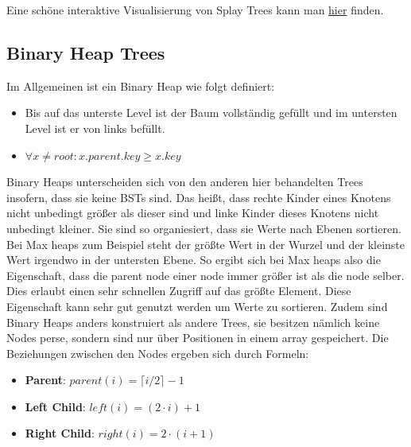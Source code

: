 \documentclass[
../AuD-Zusammenfassung.tex,
]
{subfiles}
\begin{document}
\begin{minipage}[t]{\textwidth}
    \centering
\end{minipage}

Eine schöne interaktive Visualisierung von Splay Trees kann man \href{https://www.cs.usfca.edu/~galles/visualization/SplayTree.html}{hier} finden.


\subsection{Binary Heap Trees}
Im Allgemeinen ist ein Binary Heap wie folgt definiert:
\begin{itemize}
    \item Bis auf das unterste Level ist der Baum vollständig gefüllt und im untersten Level ist er von links befüllt.
    \item $\forall x \neq root: x.parent.key \geq x.key$
\end{itemize}
Binary Heaps unterscheiden sich von den anderen hier behandelten Trees insofern, dass sie keine BSTs sind. Das heißt, dass rechte Kinder eines Knotens nicht unbedingt größer als dieser sind und linke Kinder dieses Knotens nicht unbedingt kleiner. Sie sind so organiesiert, dass sie Werte nach Ebenen sortieren. Bei Max heaps zum Beispiel steht der größte Wert in der Wurzel und der kleinste Wert irgendwo in der untersten Ebene. So ergibt sich bei Max heaps also die Eigenschaft, dass die parent node einer node immer größer ist als die node selber. Dies erlaubt einen sehr schnellen Zugriff auf das größte Element. Diese Eigenschaft kann sehr gut genutzt werden um Werte zu sortieren. Zudem sind Binary Heaps anders konstruiert als andere Trees, sie besitzen nämlich keine Nodes perse, sondern sind nur über Positionen in einem array gespeichert. Die Beziehungen zwischen den Nodes ergeben sich durch Formeln:
\begin{itemize}
    \item \textbf{Parent}: $parent(i) = \lceil i / 2 \rceil -1$
    \item \textbf{Left Child}: $left(i) = (2 \cdot i) + 1$
    \item \textbf{Right Child}: $right(i) = 2 \cdot (i + 1)$
\end{itemize}
\end{document}
